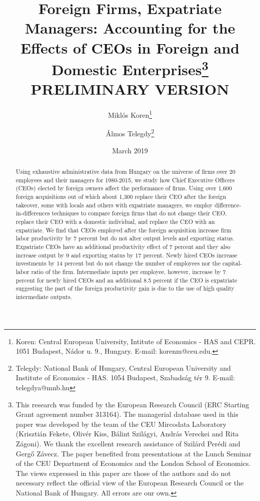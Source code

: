 \documentclass[12pt,a4paper]{article}
\begin{document}
\title{Foreign Firms, Expatriate Managers: Accounting for the Effects of CEOs in Foreign and Domestic Enterprises\thanks{This research was funded by the European Research Council (ERC Starting Grant agreement number 313164). The managerial database used in this paper was developed by the team of the CEU Mircodata Laboratory (Krisztián Fekete, Olivér Kiss, Bálint Szilágyi, András Vereckei and Rita Zágoni). We thank the excellent research assistance of Szilárd Perédi and Gergő Závecz. The paper benefited from presentations at the Lunch Seminar of the CEU Department of Economics and the London School of Economics. The views expressed in this paper are those of the authors and do not necessary reflect the official view of the European Research Council or the National Bank of Hungary. All errors are our own.}\newline\\\small{PRELIMINARY VERSION}}

\author{Miklós Koren\thanks{Koren: Central European University, Intitute of Economics - HAS and CEPR. 1051 Budapest, Nádor u. 9., Hungary. E-mail: korenm@ceu.edu.} \and Álmos Telegdy\thanks{Telegdy: National Bank of Hungary, Central European University and Institute of Economics - HAS. 1054 Budapest, Szabadság tér 9. E-mail: telegdya@mnb.hu}}

\date{March 2019}
\maketitle

\begin{abstract}
Using exhaustive administrative data from Hungary on the universe of firms over 20 employees and their managers for 1980-2015, we study how Chief Executive Officers (CEOs) elected by foreign owners affect the performance of firms. Using over 1,600 foreign acquisitions out of which about 1,300 replace their CEO after the foreign takeover, some with locals and others with expatriate managers, we employ difference-in-differences techniques to compare foreign firms that do not change their CEO, replace their CEO with a domestic individual, and replace the CEO with an expatriate. We find that CEOs employed after the foreign acquisition increase firm labor productivity by 7 percent but do not alter output levels and exporting status. Expatriate CEOs have an additional productivity effect of 7 percent and they also increase output by 9 and exporting status by 17 percent. Newly hired CEOs increase investments by 14 percent but do not change the number of employees nor the capital-labor ratio of the firm. Intermediate inputs per employee, however, increase by 7 percent for newly hired CEOs and an additional 8.5 percent if the CEO is expatriate suggesting the part of the foreign productivity gain is due to the use of high quality intermediate outputs. 
\end{abstract}
\end{document}
